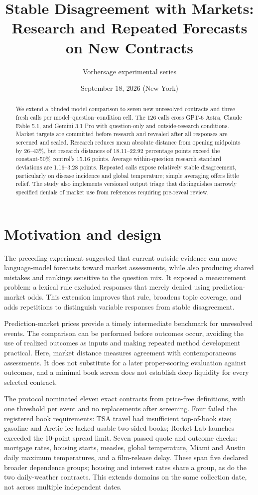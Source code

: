 \documentclass[11pt]{article}
\title{Stable Disagreement with Markets:\\Research and Repeated Forecasts on New Contracts}
\author{Vorhersage experimental series}
\date{September 18, 2026 (New York)}
\begin{document}
\maketitle
\begin{abstract}
We extend a blinded model comparison to seven new unresolved contracts and
three fresh calls per model--question--condition cell. The 126 calls cross
GPT-6 Astra, Claude Fable 5.1, and Gemini 3.1 Pro with question-only and
outside-research conditions. Market targets are committed before research and
revealed after all responses are screened and sealed. Research reduces mean
absolute distance from opening midpoints by 26--43\%, but research distances
of 18.11--22.92 percentage points exceed the constant-50\% control's 15.16 points.
Average within-question research standard deviations are 1.16--3.28 points.
Repeated calls expose relatively stable disagreement, particularly on disease
incidence and global temperature; simple averaging offers little relief.
The study also implements versioned output triage that distinguishes narrowly
specified denials of market use from references requiring pre-reveal review.
\end{abstract}

\section{Motivation and design}
The preceding experiment suggested that current outside evidence can move
language-model forecasts toward market assessments, while also producing
shared mistakes and rankings sensitive to the question mix. It exposed a
measurement problem: a lexical rule excluded responses that merely denied
using prediction-market odds. This extension improves that rule, broadens
topic coverage, and adds repetitions to distinguish variable responses from
stable disagreement.

Prediction-market prices provide a timely intermediate benchmark for unresolved
events. The comparison can be performed before outcomes occur, avoiding the
use of realized outcomes as inputs and making repeated method development
practical. Here, market distance measures agreement with contemporaneous
assessments. It does not substitute for a later proper-scoring evaluation
against outcomes, and a minimal book screen does not establish deep liquidity
for every selected contract.

The protocol nominated eleven exact contracts from price-free definitions,
with one threshold per event and no replacements after screening. Four failed
the registered book requirements: TSA travel had insufficient top-of-book
size; gasoline and Arctic ice lacked usable two-sided books; Rocket Lab
launches exceeded the 10-point spread limit. Seven passed quote and outcome
checks: mortgage rates, housing starts, measles, global temperature, Miami and
Austin daily maximum temperatures, and a film-release delay. These span five
declared broader dependence groups; housing and interest rates share a group,
as do the two daily-weather contracts. This extends domains on the same
collection date, not across multiple independent dates.
\end{document}
